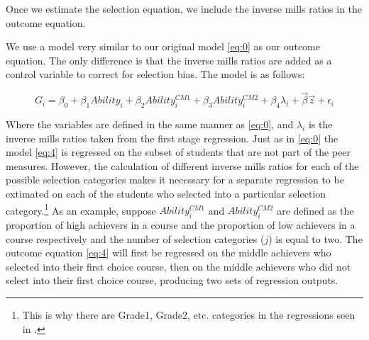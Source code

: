 \noindent Once we estimate the selection equation, we include the inverse mills ratios in the outcome equation.

We use a model very similar to our original model \eqref{eq:0} as our outcome equation. 
The only difference is that the inverse mills ratios are added as a control variable to correct for selection bias. 
The model is as follows:

\begin{equation}\label{eq:4}
G_{i} = \beta_{0} + \beta_{1} Ability_{i} + \beta_{2} Ability_{i}^{CM1} + \beta_{3} Ability_{i}^{CM2} + \beta_{4} \lambda_{i} + \overrightarrow{\beta} \overrightarrow{z} + \epsilon_{i}
\end{equation}

Where the variables are defined in the same manner as \eqref{eq:0}, and $\lambda_{i}$ is the inverse mills ratios taken from the first stage regression.
Just as in \eqref{eq:0} the model \eqref{eq:4} is regressed on the subset of students that are not part of the peer measures. 
However, the calculation of different inverse mills ratios for each of the possible selection categories makes it necessary for a separate regression to be extimated on each of the students who selected into a particular selection category.\footnote{This is why there are Grade1, Grade2, etc. categories in the regressions seen in .}
As an example, suppose $Ability_{i}^{CM1}$ and $Ability_{i}^{CM2}$ are defined as the proportion of high achievers in a course and the proportion of low achievers in a course respectively and the number of selection categories ($j$) is equal to two. 
The outcome equation \eqref{eq:4} will first be regressed on the middle achievers who selected into their first choice course, then on the middle achievers who did not select into their first choice course, producing two sets of regression outputs. 